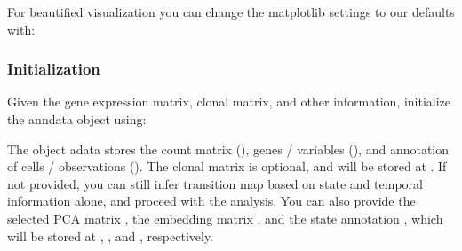 \documentclass[letterpaper,10pt,english]{sphinxmanual}
\begin{document}
For beautified visualization you can change the matplotlib settings to our defaults with:

\begin{sphinxVerbatim}[commandchars=\\\{\}]
\end{sphinxVerbatim}


\subsubsection{Initialization}
\label{\detokenize{getting_started:initialization}}
Given the gene expression matrix, clonal matrix, and other information, initialize the anndata object using:

\begin{sphinxVerbatim}[commandchars=\\\{\}]
  
\PYG{p}{[}\PYG{p}{]}\PYG{p}{[}\PYG{p}{]}\PYG{p}{[}\PYG{p}{]}\PYG{p}{[}\PYG{p}{]}
\end{sphinxVerbatim}

The  object adata stores the count matrix (), genes / variables (), and  annotation of cells / observations ().  The clonal matrix  is optional, and will be stored at  .  If not provided, you can still infer transition map based on state and temporal information alone, and proceed with the analysis. You can also provide the selected PCA matrix ,  the embedding matrix , and the state annotation , which will be stored at , , and , respectively.
\end{document}
